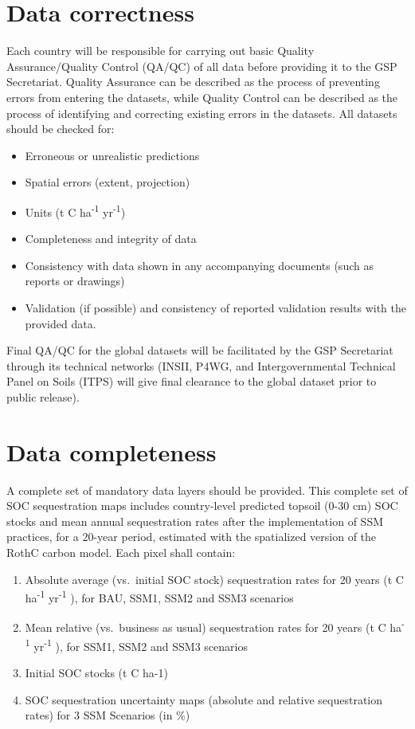 \documentclass[
  10pt,
  b5paper,
]{book}
\providecommand{\tightlist}{%
  \setlength{\itemsep}{0pt}\setlength{\parskip}{0pt}}
\begin{document}
\hypertarget{data-correctness}{%
\section{Data correctness}\label{data-correctness}}

Each country will be responsible for carrying out basic Quality Assurance/Quality Control (QA/QC) of all data before providing it to the GSP Secretariat. Quality Assurance can be described as the process of preventing errors from entering the datasets, while Quality Control can be described as the process of identifying and correcting existing errors in the datasets.
All datasets should be checked for:

\begin{itemize}
\tightlist
\item
  Erroneous or unrealistic predictions
\item
  Spatial errors (extent, projection)
\item
  Units (t C ha\textsuperscript{-1} yr\textsuperscript{-1})
\item
  Completeness and integrity of data
\item
  Consistency with data shown in any accompanying documents (such as reports or drawings)
\item
  Validation (if possible) and consistency of reported validation results with the provided data.
\end{itemize}

Final QA/QC for the global datasets will be facilitated by the GSP Secretariat through its technical networks (INSII, P4WG, and Intergovernmental Technical Panel on Soils (ITPS) will give final clearance to the global dataset prior to public release).

\hypertarget{data-completeness}{%
\section{Data completeness}\label{data-completeness}}

A complete set of mandatory data layers should be provided. This complete set of SOC sequestration maps includes country-level predicted topsoil (0-30 cm) SOC stocks and mean annual sequestration rates after the implementation of SSM practices, for a 20-year period, estimated with the spatialized version of the RothC carbon model. Each pixel shall contain:

\begin{enumerate}
\def\labelenumi{\arabic{enumi}.}
\tightlist
\item
  Absolute average (vs.~initial SOC stock) sequestration rates for 20 years (t C ha\textsuperscript{-1} yr\textsuperscript{-1} ), for BAU, SSM1, SSM2 and SSM3 scenarios
\item
  Mean relative (vs.~business as usual) sequestration rates for 20 years (t C ha\textsuperscript{-1} yr\textsuperscript{-1} ), for SSM1, SSM2 and SSM3 scenarios
\item
  Initial SOC stocks (t C ha-1)
\item
  SOC sequestration uncertainty maps (absolute and relative sequestration rates) for 3 SSM Scenarios (in \%)
\end{enumerate}
\end{document}
